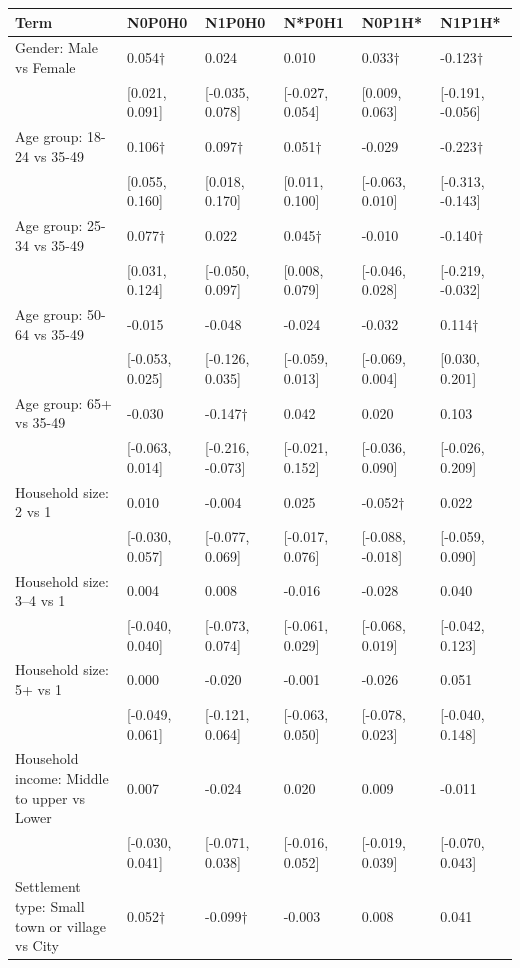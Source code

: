 
\begin{tabular}[t]{llllll}
\toprule
Term & N0P0H0 & N1P0H0 & N*P0H1 & N0P1H* & N1P1H*\\
\midrule
Gender: Male vs Female & 0.054$\dagger$ & 0.024 & 0.010 & 0.033$\dagger$ & -0.123$\dagger$\\
 & {}[0.021, 0.091] & {}[-0.035, 0.078] & {}[-0.027, 0.054] & {}[0.009, 0.063] & {}[-0.191, -0.056]\\
Age group: 18-24 vs 35-49 & 0.106$\dagger$ & 0.097$\dagger$ & 0.051$\dagger$ & -0.029 & -0.223$\dagger$\\
 & {}[0.055, 0.160] & {}[0.018, 0.170] & {}[0.011, 0.100] & {}[-0.063, 0.010] & {}[-0.313, -0.143]\\
Age group: 25-34 vs 35-49 & 0.077$\dagger$ & 0.022 & 0.045$\dagger$ & -0.010 & -0.140$\dagger$\\
 & {}[0.031, 0.124] & {}[-0.050, 0.097] & {}[0.008, 0.079] & {}[-0.046, 0.028] & {}[-0.219, -0.032]\\
Age group: 50-64 vs 35-49 & -0.015 & -0.048 & -0.024 & -0.032 & 0.114$\dagger$\\
 & {}[-0.053, 0.025] & {}[-0.126, 0.035] & {}[-0.059, 0.013] & {}[-0.069, 0.004] & {}[0.030, 0.201]\\
Age group: 65+ vs 35-49 & -0.030 & -0.147$\dagger$ & 0.042 & 0.020 & 0.103\\
 & {}[-0.063, 0.014] & {}[-0.216, -0.073] & {}[-0.021, 0.152] & {}[-0.036, 0.090] & {}[-0.026, 0.209]\\
Household size: 2 vs 1 & 0.010 & -0.004 & 0.025 & -0.052$\dagger$ & 0.022\\
 & {}[-0.030, 0.057] & {}[-0.077, 0.069] & {}[-0.017, 0.076] & {}[-0.088, -0.018] & {}[-0.059, 0.090]\\
Household size: 3–4 vs 1 & 0.004 & 0.008 & -0.016 & -0.028 & 0.040\\
 & {}[-0.040, 0.040] & {}[-0.073, 0.074] & {}[-0.061, 0.029] & {}[-0.068, 0.019] & {}[-0.042, 0.123]\\
Household size: 5+ vs 1 & 0.000 & -0.020 & -0.001 & -0.026 & 0.051\\
 & {}[-0.049, 0.061] & {}[-0.121, 0.064] & {}[-0.063, 0.050] & {}[-0.078, 0.023] & {}[-0.040, 0.148]\\
Household income: Middle to upper vs Lower & 0.007 & -0.024 & 0.020 & 0.009 & -0.011\\
 & {}[-0.030, 0.041] & {}[-0.071, 0.038] & {}[-0.016, 0.052] & {}[-0.019, 0.039] & {}[-0.070, 0.043]\\
Settlement type: Small town or village vs City & 0.052$\dagger$ & -0.099$\dagger$ & -0.003 & 0.008 & 0.041\\

\end{tabular}
